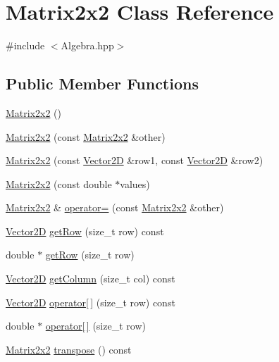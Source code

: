 \hypertarget{class_matrix2x2}{\section{Matrix2x2 Class Reference}
\label{class_matrix2x2}
}


{\ttfamily \#include $<$Algebra.\-hpp$>$}

\subsection*{Public Member Functions}
\begin{DoxyCompactItemize}
\item 
\hyperlink{class_matrix2x2_aca3f61a3a1bce86fd10f3e8b70f70e81}{Matrix2x2} ()
\item 
\hyperlink{class_matrix2x2_ace1cda72cf042dd31876c0d059c9e9bf}{Matrix2x2} (const \hyperlink{class_matrix2x2}{Matrix2x2} \&other)
\item 
\hyperlink{class_matrix2x2_a001283eaf70db2e8f935ef103b3fe98e}{Matrix2x2} (const \hyperlink{class_vector2_d}{Vector2\-D} \&row1, const \hyperlink{class_vector2_d}{Vector2\-D} \&row2)
\item 
\hyperlink{class_matrix2x2_af05682ae3b80edd3b14ac43db5ef0c08}{Matrix2x2} (const double $\ast$values)
\item 
\hyperlink{class_matrix2x2}{Matrix2x2} \& \hyperlink{class_matrix2x2_af1e1812c8ecd1f5fe0de70780e996b53}{operator=} (const \hyperlink{class_matrix2x2}{Matrix2x2} \&other)
\item 
\hyperlink{class_vector2_d}{Vector2\-D} \hyperlink{class_matrix2x2_a3a03aae0dde8aaf2579bbead6e58c25a}{get\-Row} (size\-\_\-t row) const 
\item 
double $\ast$ \hyperlink{class_matrix2x2_a72cd1d0d3fc8876b6a17632079c45227}{get\-Row} (size\-\_\-t row)
\item 
\hyperlink{class_vector2_d}{Vector2\-D} \hyperlink{class_matrix2x2_a299ddc8aba2c00d3e61071ac8261b17a}{get\-Column} (size\-\_\-t col) const 
\item 
\hyperlink{class_vector2_d}{Vector2\-D} \hyperlink{class_matrix2x2_a83296205a183d5ab07aa6b4947c16bf2}{operator\mbox{[}$\,$\mbox{]}} (size\-\_\-t row) const 
\item 
double $\ast$ \hyperlink{class_matrix2x2_a6e607183b40dd89bb123971a09f99f91}{operator\mbox{[}$\,$\mbox{]}} (size\-\_\-t row)
\item 
\hyperlink{class_matrix2x2}{Matrix2x2} \hyperlink{class_matrix2x2_a7630ef26f2a09c33137b680a468a114b}{transpose} () const 

\end{DoxyCompactItemize}
